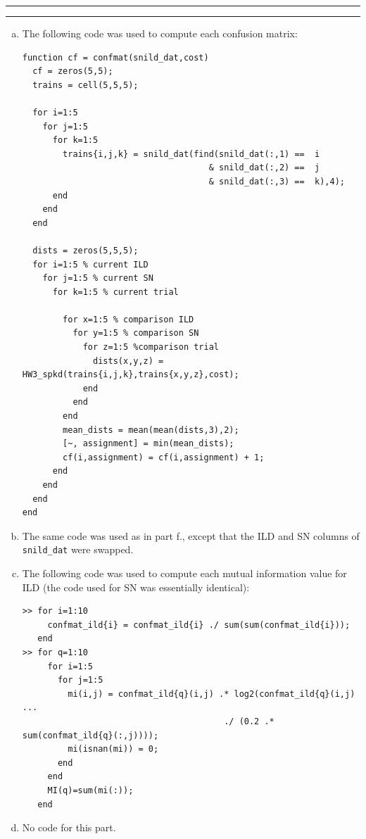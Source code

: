 \documentclass[11pt]{article}
\newcounter{questionCounter}
\newcounter{partCounter}[questionCounter]
\newenvironment{question}[2][\arabic{questionCounter}]{%
    \setcounter{partCounter}{0}%
    \vspace{.25in} \hrule \vspace{0.5em}%
        \noindent{\bf #2}%
    \vspace{0.8em} \hrule \vspace{.10in}%
    \addtocounter{questionCounter}{1}%
}{}
\begin{document}
\begin{question}{Problem 2}
\begin{enumerate}[a.]
\item The following code was used to compute each confusion matrix:
\begin{verbatim}
function cf = confmat(snild_dat,cost)
  cf = zeros(5,5);
  trains = cell(5,5,5);

  for i=1:5
    for j=1:5
      for k=1:5
        trains{i,j,k} = snild_dat(find(snild_dat(:,1) ==  i
                                     & snild_dat(:,2) ==  j
                                     & snild_dat(:,3) ==  k),4);
      end
    end
  end

  dists = zeros(5,5,5);
  for i=1:5 % current ILD
    for j=1:5 % current SN
      for k=1:5 % current trial

        for x=1:5 % comparison ILD
          for y=1:5 % comparison SN
            for z=1:5 %comparison trial
              dists(x,y,z) = HW3_spkd(trains{i,j,k},trains{x,y,z},cost);
            end
          end
        end
        mean_dists = mean(mean(dists,3),2);
        [~, assignment] = min(mean_dists);
        cf(i,assignment) = cf(i,assignment) + 1;
      end
    end
  end
end

\end{verbatim}

\item The same code was used as in part f., except that the ILD and SN columns
of \texttt{snild\_dat} were swapped.

\item The following code was used to compute each mutual information value for
ILD (the code used for SN was essentially identical):
\begin{verbatim}
>> for i=1:10
     confmat_ild{i} = confmat_ild{i} ./ sum(sum(confmat_ild{i}));
   end
>> for q=1:10
     for i=1:5
       for j=1:5
         mi(i,j) = confmat_ild{q}(i,j) .* log2(confmat_ild{q}(i,j) ...
                                        ./ (0.2 .* sum(confmat_ild{q}(:,j))));
         mi(isnan(mi)) = 0;
       end
     end
     MI(q)=sum(mi(:));
   end
\end{verbatim}

\item No code for this part.

\end{enumerate}
\end{question}
\end{document}
